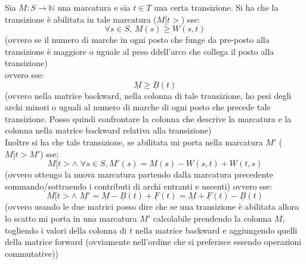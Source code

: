 \documentclass[a4paper,12pt, oneside]{book}
\begin{document}
\begin{definizione}
  Sia $M:S\to\mathbb{N}$ una marcatura e sia $t\in T$ una certa transizione. Si
  ha che la transizione è abilitata in tale marcatura ($M[t>$) sse:
  \[\forall s\in S,\,M(s)\geq W(s,t)\]
  (ovvero se il numero di marche in ogni posto che funge da pre-posto alla
  transizione è maggiore o uguale al peso ddell'arco che collega il posto alla
  transizione) \\
  ovvero sse:
  \[\underline{M}\geq \underline{B}(t)\]
  (ovvero nella matrice backward, nella colonna di tale transizione, ho pesi
  degli archi minori o uguali al numero di marche di ogni posto che precede tale
  transizione. Posso quindi confrontare la colonna che descrive la marcatura e
  la colonna nella matrice backward relativa alla transizione)\\
  Inoltre si ha che tale transizione, se abilitata mi porta nella marcatura $M'$
  ($M[t>M'$) sse:
  \[M[t > \wedge \,\,\forall s \in S, M'(s) = M(s) − W (s, t) + W (t, s)\]
  (ovvero ottengo la nuova marcatura partendo dalla marcatura precedente 
  sommando/sottraendo i contributi di archi entranti e uscenti)
  ovvero sse:
  \[M[t > \wedge\,\, \underline{M'} = \underline{M} − \underline{B}(t) +
    \underline{F} (t) = \underline{M} + \underline{F} (t) − \underline{B}(t)\]
  (ovvero usando le due matrici posso dire che se una transizione è abilitata
  allora lo scatto mi porta in una marcatura $M'$ calcolabile prendendo la
  colonna $M$, togliendo i valori della colonna di $t$ nella matrice backward e
  aggiungendo quelli della matrice forward (ovviamente nell'ordine che si
  preferisce essendo operazioni commutative)) 
\end{definizione}
\newpage
\end{document}
